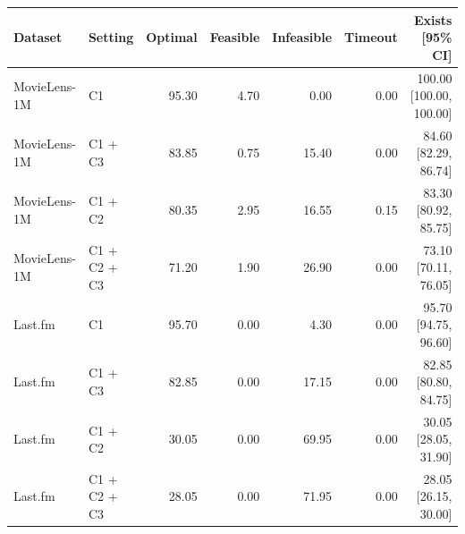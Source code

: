 \begin{tabular}{llrrrrr}
\toprule
Dataset & Setting & Optimal & Feasible & Infeasible & Timeout & Exists [95\% CI] \\
\midrule
MovieLens-1M & C1 & 95.30 & 4.70 & 0.00 & 0.00 & 100.00 [100.00, 100.00] \\
MovieLens-1M & C1 + C3 & 83.85 & 0.75 & 15.40 & 0.00 & 84.60 [82.29, 86.74] \\
MovieLens-1M & C1 + C2 & 80.35 & 2.95 & 16.55 & 0.15 & 83.30 [80.92, 85.75] \\
MovieLens-1M & C1 + C2 + C3 & 71.20 & 1.90 & 26.90 & 0.00 & 73.10 [70.11, 76.05] \\
Last.fm & C1 & 95.70 & 0.00 & 4.30 & 0.00 & 95.70 [94.75, 96.60] \\
Last.fm & C1 + C3 & 82.85 & 0.00 & 17.15 & 0.00 & 82.85 [80.80, 84.75] \\
Last.fm & C1 + C2 & 30.05 & 0.00 & 69.95 & 0.00 & 30.05 [28.05, 31.90] \\
Last.fm & C1 + C2 + C3 & 28.05 & 0.00 & 71.95 & 0.00 & 28.05 [26.15, 30.00] \\
\bottomrule
\end{tabular}
